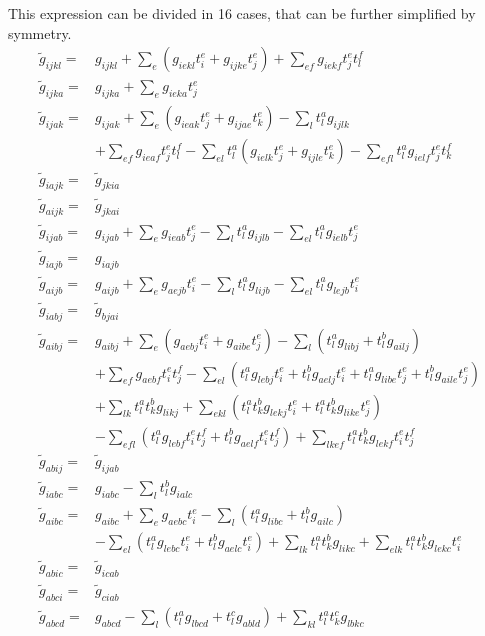 This expression can be divided in 16 cases, that can be further simplified by symmetry.
\begin{align}
  {\tilde g}_{ijkl}=&g_{ijkl}+\sum_{e}(g_{iekl}t_i^e+g_{ijke}t_j^e)+\sum_{ef}g_{iekf}t_j^et_l^f\\
  {\tilde g}_{ijka}=&g_{ijka}+\sum_{e}g_{ieka}t_j^e\\ 
  {\tilde g}_{ijak}=&g_{ijak}+\sum_{e}(g_{ieak}t_j^e+g_{ijae}t_k^e)-\sum_lt_l^ag_{ijlk}\nonumber\\
  &+\sum_{ef}g_{ieaf}t_j^et_l^f-\sum_{el}t_l^a(g_{ielk}t_j^e+g_{ijle}t_k^e)-\sum_{efl}t_l^ag_{ielf}t_j^et_k^f\\
  {\tilde g}_{iajk}=&{\tilde g}_{jkia}\\
  {\tilde g}_{aijk}=&{\tilde g}_{jkai}\\
  {\tilde g}_{ijab}=&g_{ijab}+\sum_{e}g_{ieab}t_j^e-\sum_{l}t_l^ag_{ijlb}-\sum_{el}t_l^ag_{ielb}t_j^e\\
  {\tilde g}_{iajb}=&g_{iajb}\\
  {\tilde g}_{aijb}=&g_{aijb}+\sum_{e}g_{aejb}t_i^e-\sum_{l}t_l^ag_{lijb}-\sum_{el}t_l^ag_{lejb}t_i^e\\
  {\tilde g}_{iabj}=&{\tilde g}_{bjai}\\
  {\tilde g}_{aibj}=&g_{aibj}+\sum_{e}(g_{aebj}t_i^e+g_{aibe}t_j^e)-\sum_{l}(t_l^ag_{libj}+t_l^bg_{ailj})\nonumber\\
  &+\sum_{ef}g_{aebf}t_i^et_j^f-\sum_{el}(t_l^ag_{lebj}t_i^e+t_l^bg_{aelj}t_i^e+t_l^ag_{libe}t_j^e+t_l^bg_{aile}t_j^e)\nonumber\\
  &+\sum_{lk}t_l^at_k^bg_{likj}+\sum_{ekl}(t_l^at_k^bg_{lekj}t_i^e+t_l^at_k^bg_{like}t_j^e)\nonumber\\
  &-\sum_{efl}(t_l^ag_{lebf}t_i^et_j^f+t_l^bg_{aelf}t_i^et_j^f)+\sum_{lkef}t_l^at_k^bg_{lekf}t_i^et_j^f\\
  {\tilde g}_{abij}=&{\tilde g}_{ijab}\\
  {\tilde g}_{iabc}=&g_{iabc}-\sum_{l}t_l^bg_{ialc}\\
  {\tilde g}_{aibc}=&g_{aibc}+\sum_{e}g_{aebc}t_i^e-\sum_l(t_l^ag_{libc}+t_l^bg_{ailc})\nonumber\\
  &-\sum_{el}(t_l^ag_{lebc}t_i^e+t_l^bg_{aelc}t_i^e)+\sum_{lk}t_l^at_k^bg_{likc}+\sum_{elk}t_l^at_k^bg_{lekc}t_i^e\\
  {\tilde g}_{abic}=&{\tilde g}_{icab}\\
  {\tilde g}_{abci}=&{\tilde g}_{ciab}\\
  {\tilde g}_{abcd}=&g_{abcd}-\sum_l(t_l^ag_{lbcd}+t_l^cg_{abld})+\sum_{kl}t_l^at_k^cg_{lbkc}
\end{align}

